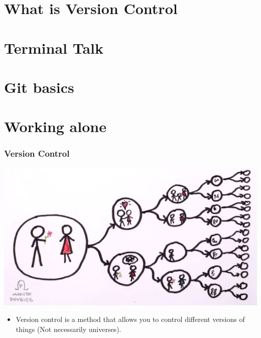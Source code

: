 \documentclass{beamer}
\begin{document}

\section{What is Version Control}
\section{Terminal Talk}

\section{Git basics}

\section{Working alone}

\begin{frame}[fragile]
\frametitle{Version Control}
\includegraphics[width=\textwidth]{Multiverse.jpg}
\begin{itemize}
\item Version control is a method that allows you to control different versions of things (Not necessarily universes).
\end{itemize}

\end{frame}
\end{document}
